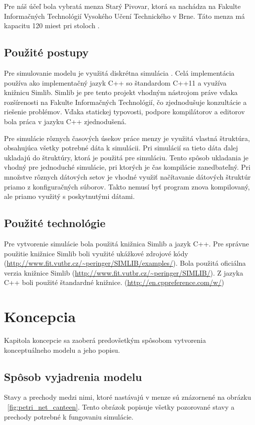 \documentclass{article}
\begin{document}
Pre náš účeľ bola vybratá menza Starý Pivovar, ktorá sa nachádza na Fakulte Informačných Technológií Vysokého Učení Technického v Brne. Táto menza má kapacitu 120 miest pri stoloch \cite{menzy}. 

\subsection{Použité postupy}
Pre simulovanie modelu je využitá diskrétna simulácia \cite[str. 34]{ims}. Celá implementácia používa ako implementačný jazyk C++ so štandardom C++11 a využíva knižnicu Simlib. Simlib je pre tento projekt vhodným nástrojom práve vďaka rozšírenosti na Fakulte Informačných Technológií, čo zjednodušuje konzultácie a riešenie problémov. Vďaka statickej typovosti, podpore kompilátorov a editorov bola práca v jazyku C++ zjednodušená.

Pre simulácie rôznych časových úsekov práce menzy je využitá vlastná štruktúra, obsahujúca všetky potrebné dáta k simulácii. Pri simulácií sa tieto dáta ďalej ukladajú do štruktúry, ktorá je použitá pre simuláciu. Tento spôsob ukladania je vhodný pre jednoduché simulácie, pri ktorých je čas kompilácie zanedbateľný. Pri množstve rôznych dátových setov je vhodné využiť načítavanie dátových štruktúr priamo z konfiguračných súborov. Takto nemusí byť program znova kompilovaný, ale priamo využitý s poskytnutými dátami.

\subsection{Použité technológie}
Pre vytvorenie simulácie bola použitá knižnica Simlib a jazyk C++. Pre správne použitie knižnice Simlib boli využité ukážkové zdrojové kódy (\url{http://www.fit.vutbr.cz/~peringer/SIMLIB/examples/}). Bola použitá oficiálna verzia knižnice Simlib (\url{http://www.fit.vutbr.cz/~peringer/SIMLIB/}). Z jazyka C++ boli použité štandardné knižnice. (\url{http://en.cppreference.com/w/})

\section{Koncepcia}
Kapitola koncepcie sa zaoberá predovšetkým spôsobom vytvorenia konceptuálneho modelu\cite[str. 48]{ims} a jeho popisu.

\subsection{Spôsob vyjadrenia modelu}
Stavy a prechody medzi nimi, ktoré nastávajú v menze sú znázornené na obrázku ~\ref{fig:petri_net_canteen}. Tento obrázok popisuje všetky pozorované stavy a prechody potrebné k fungovaniu simulácie.
\end{document}

